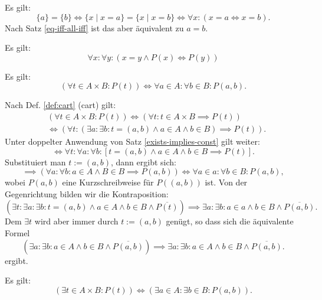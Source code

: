 \begin{Beweis}
Es gilt:
\[\{a\}=\{b\}\iff \{x\mid x=a\}=\{x\mid x=b\}\iff \forall x\colon (x=a\iff x=b).\]
Nach Satz \ref{eq-iff-all-iff} ist das aber äquivalent zu $a=b$.\;\qedsymbol
\end{Beweis}

\begin{Satz}\label{eq-substitution}
Es gilt:
\[\forall x\colon\forall y\colon (x=y\land P(x)\iff P(y))\]
\end{Satz}

\begin{Satz}\label{all-cart}
Es gilt:
\[(\forall t \in A{\times}B\colon P(t)) \iff \forall a{\in}A\colon\forall b{\in}B\colon P(a,b).\]
\end{Satz}

\begin{Beweis}
Nach Def. \ref{def:cart} (cart) gilt:
\begin{align*}
&(\forall t \in A{\times}B\colon P(t))\iff (\forall t\colon t\in A\times B\implies P(t))\\
&\iff (\forall t\colon (\exists a\colon\exists b\colon t=(a,b)\land a\in A\land b\in B)\implies P(t)).
\end{align*}
Unter doppelter Anwendung von Satz \ref{exists-implies-const} gilt weiter:
\[\iff \forall t\colon\forall a\colon\forall b\colon [t=(a,b)\land a\in A\land b\in B\implies P(t)].\]
Substituiert man $t:=(a,b)$, dann ergibt sich:
\[\implies (\forall a\colon\forall b\colon a\in A\land B\in B\implies P(a,b))
\iff \forall a{\in}a\colon\forall b{\in}B\colon P(a,b),\]
wobei $P(a,b)$ eine Kurzschreibweise für $P((a,b))$ ist.
Von der Gegenrichtung bilden wir die Kontraposition:
\[(\exists t\colon\exists a\colon\exists b\colon t=(a,b)\land a\in A\land b\in B\land \overline{P(t)})
\implies \exists a\colon\exists b\colon a\in a\land b\in B\land \overline{P(a,b)}.\]
Dem $\exists t$ wird aber immer durch $t:=(a,b)$ genügt, so dass sich die
äquivalente Formel
\[(\exists a\colon\exists b\colon a\in A\land b\in B\land \overline{P(a,b)})
\implies \exists a\colon \exists b\colon a\in A\land b\in B\land \overline{P(a,b)}.\]
ergibt.\;\qedsymbol
\end{Beweis}

\begin{Satz}\label{exists-cart}
Es gilt:
\[(\exists t\in A{\times}B\colon P(t))
\iff (\exists a{\in}A\colon \exists b{\in}B\colon P(a,b)).\]
\end{Satz}

